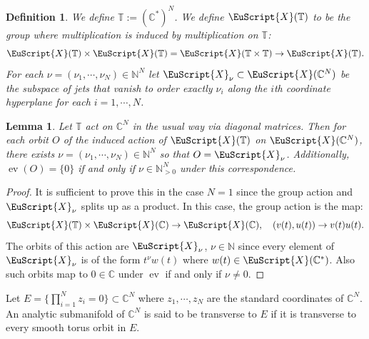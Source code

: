 \documentclass[11pt]{amsart}
\newtheorem{defn}[thm]{Definition}
\newtheorem{lemma}[thm]{Lemma}
\newcommand{\scrX}{\EuScript{X}}
\newcommand{\bC}{\mathbb{C}}
\newcommand{\bN}{\mathbb{N}}
\numberwithin{equation}{section}
\newcommand{\bT}{\mathbb{T}}
\newcommand{\ev}{\operatorname{ev}}
\begin{document}
\begin{defn} \label{defntorusandcontact}
	We define $\bT := (\bC^*)^N$. We define $\scrX(\bT)$ to be the group where multiplication is induced by multiplication on $\bT$:
	\begin{equation}
		\scrX(\bT) \times \scrX(\bT) = \scrX(\bT \times \bT) \to \scrX(\bT).
	\end{equation}
	For each $\nu=(\nu_1,\cdots,\nu_N) \in \bN^N$ let $\scrX_\nu \subset \scrX(\bC^N)$ be the subspace of jets that vanish to order exactly $\nu_i$ along the $i$th coordinate hyperplane for each $i=1,\cdots,N$.
\end{defn}


\begin{lemma} \label{lemmaorbitsofscrXbT}
	Let $\bT$ act on $\bC^N$ in the usual way via diagonal matrices.
	Then for each orbit $O$ of the induced action of $\scrX(\bT)$ on $\scrX(\bC^N)$, there exists $\nu=(\nu_1,\cdots,\nu_N) \in \bN^N$ so that $O = \scrX_\nu$.
	Additionally, $\ev(O) = \{0\}$ if and only if $\nu \in \bN^N_{>0}$ under this correspondence.
\end{lemma}
\begin{proof}
	It is sufficient to prove this in the case $N=1$ since the group action and $\scrX_\nu$ splits up as a product.
	In this case, the group action is the map:
	\begin{equation}
		\scrX(\bT) \times \scrX(\bC) \to \scrX(\bC), \quad (v(t),u(t)) \to v(t)u(t).
	\end{equation}
	The orbits of this action are $\scrX_\nu$, $\nu \in \bN$ since every element of $\scrX_\nu$ is of the form $t^\nu w(t)$ where $w(t) \in \scrX(\bC^*)$.
	Also such orbits map to $0 \in \bC$ under $\ev$ if and only if $\nu \neq 0$.
\end{proof}

Let $E = \{\prod_{i=1}^N z_i = 0\} \subset \bC^N$ where $z_1,\cdots,z_N$ are the standard coordinates of $\bC^N$. An analytic submanifold of $\bC^N$ is said to be transverse to $E$ if it is transverse to every smooth torus orbit in $E$.
\end{document}
